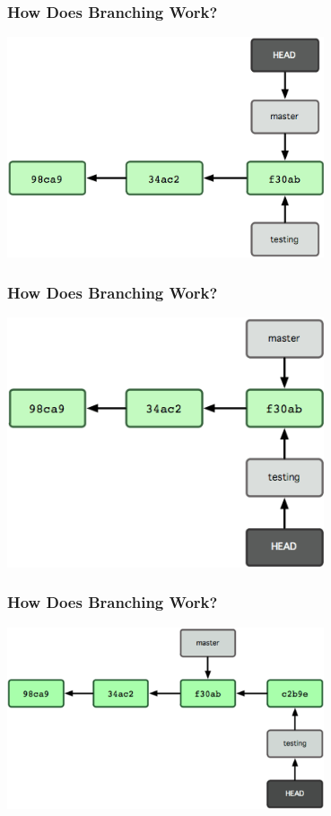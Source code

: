 \begin{frame}
\frametitle{\large How Does Branching Work?}
\begin{center}
\includegraphics[width=0.7\textwidth]{img/branching_images/fig5.png}
\end{center}
\end{frame}

\begin{frame}
\frametitle{\large How Does Branching Work?}
\begin{center}
\includegraphics[width=0.7\textwidth]{img/branching_images/fig6.png}
\end{center}
\end{frame}

\begin{frame}
\frametitle{\large How Does Branching Work?}
\begin{center}
\includegraphics[width=0.7\textwidth]{img/branching_images/fig7.png}
\end{center}
\end{frame}

